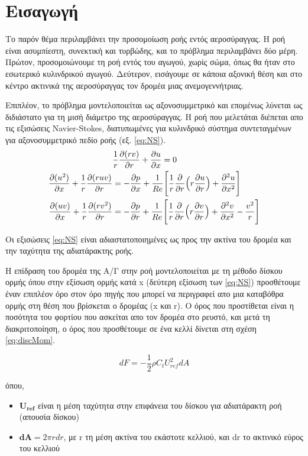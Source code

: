 \section*{Εισαγωγή}

Το παρόν θέμα περιλαμβάνει την προσομοίωση ροής εντός αεροσύραγγας. Η ροή είναι ασυμπίεστη, συνεκτική και τυρβώδης, και το πρόβλημα περιλαμβάνει δύο μέρη. Πρώτον, προσομοιώνουμε τη ροή εντός του αγωγού, χωρίς σώμα, όπως θα ήταν στο εσωτερικό κυλινδρικού αγωγού. Δεύτερον, εισάγουμε σε κάποια αξονική θέση και στο κέντρο ακτινικά της αεροσύραγγας τον δρομέα μιας ανεμογεννήτριας. 

Επιπλέον, το πρόβλημα μοντελοποιείται ως αξονοσυμμετρικό και επομένως λύνεται ως διδιάστατο για τη μισή διάμετρο της αεροσύραγγας.
Η ροή που μελετάται διέπεται απο τις εξισώσεις Navier-Stokes, διατυπωμένες για κυλινδρικό σύστημα συντεταγμένων για αξονοσυμμετρικό πεδίο ροής (εξ. \ref{eq:NS}).
\begin{equation}
    \begin{aligned}
        &\dfrac{1}{r}\dfrac{\partial(rv)}{\partial r} + \dfrac{\partial u}{\partial x} = 0\\ 
        \dfrac{\partial (u^2)}{\partial x}+\dfrac{1}{r}\dfrac{\partial (ruv)}{\partial r} &= -\dfrac{\partial p}{\partial x} + \dfrac{1}{Re}\Bigg[\dfrac{1}{r}\dfrac{\partial }{\partial r}\Big(r\dfrac{\partial u}{\partial r}\Big) + \dfrac{\partial ^2u}{\partial x^2}\Bigg]\\
        \dfrac{\partial (uv)}{\partial x}+\dfrac{1}{r}\dfrac{\partial (rv^2)}{\partial r}&=-\dfrac{\partial p}{\partial r}+\dfrac{1}{Re}\Bigg[\dfrac{1}{r}\dfrac{\partial }{\partial r}\Big(r\dfrac{\partial v}{\partial r}\Big)+\dfrac{\partial ^2v}{\partial x^2}-\dfrac{v^2}{r}\Bigg] 
    \end{aligned}
    \label{eq:NS}
\end{equation}

Οι εξισώσεις \ref{eq:NS} είναι αδιαστατοποιημένες ως προς την ακτίνα του δρομέα και την ταχύτητα της αδιατάρακτης ροής.

Η επίδραση του δρομέα της Α/Γ στην ροή μοντελοποιείται με τη μέθοδο δίσκου ορμής όπου στην εξίσωση ορμής κατά x (δεύτερη εξίσωση των \ref{eq:NS}) προσθέτουμε έναν επιπλέον όρο στον όρο πηγής που μπορεί να περιγραφεί απο μια καταβόθρα ορμής στη θέση που βρίσκεται ο δρομέας (x και r). Ο όρος που προστίθεται είναι η ποσότητα του φορτίου που ασκείται απο τον δρομέα στο ρευστό, και μετά τη διακριτοποίηση, ο όρος που προσθέτουμε σε ένα κελλί δίνεται στη σχέση \ref{eq:discMom}.

\begin{equation}
    dF = -\dfrac{1}{2}\rho C_tU^2_{ref}dA
    \label{eq:discMom}
\end{equation}

όπου,
\begin{itemize}
    \item $\mathbf{U_{ref}}$ είναι η μέση ταχύτητα στην επιφάνεια του δίσκου για αδιατάρακτη ροή (απουσία δίσκου)
    \item $\mathbf{dA} = 2\pi rdr$, με r τη μέση ακτίνα του εκάστοτε κελλιού, και dr το ακτινικό εύρος του κελλιού
\end{itemize}
